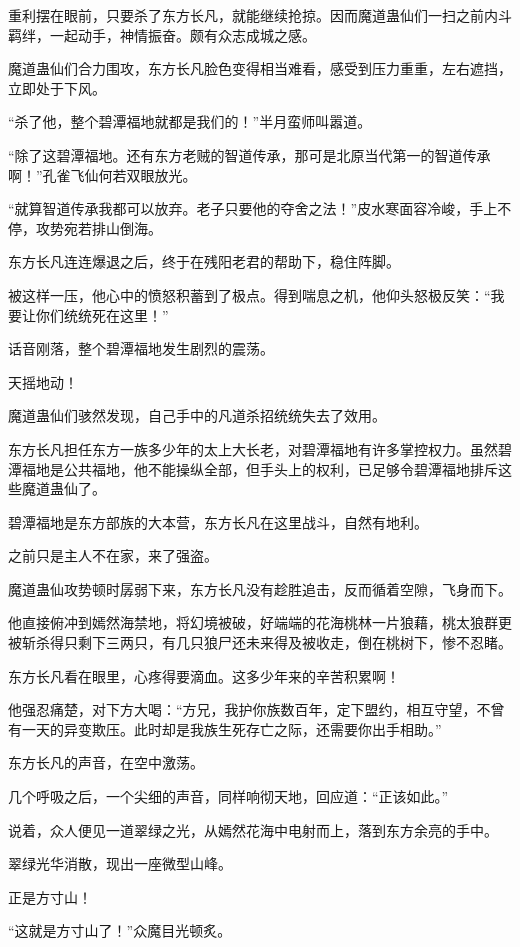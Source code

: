 \begin{this_body}
重利摆在眼前，只要杀了东方长凡，就能继续抢掠。因而魔道蛊仙们一扫之前内斗羁绊，一起动手，神情振奋。颇有众志成城之感。

魔道蛊仙们合力围攻，东方长凡脸色变得相当难看，感受到压力重重，左右遮挡，立即处于下风。

“杀了他，整个碧潭福地就都是我们的！”半月蛮师叫嚣道。

“除了这碧潭福地。还有东方老贼的智道传承，那可是北原当代第一的智道传承啊！”孔雀飞仙何若双眼放光。

“就算智道传承我都可以放弃。老子只要他的夺舍之法！”皮水寒面容冷峻，手上不停，攻势宛若排山倒海。

东方长凡连连爆退之后，终于在残阳老君的帮助下，稳住阵脚。

被这样一压，他心中的愤怒积蓄到了极点。得到喘息之机，他仰头怒极反笑：“我要让你们统统死在这里！”

话音刚落，整个碧潭福地发生剧烈的震荡。

天摇地动！

魔道蛊仙们骇然发现，自己手中的凡道杀招统统失去了效用。

东方长凡担任东方一族多少年的太上大长老，对碧潭福地有许多掌控权力。虽然碧潭福地是公共福地，他不能操纵全部，但手头上的权利，已足够令碧潭福地排斥这些魔道蛊仙了。

碧潭福地是东方部族的大本营，东方长凡在这里战斗，自然有地利。

之前只是主人不在家，来了强盗。

魔道蛊仙攻势顿时孱弱下来，东方长凡没有趁胜追击，反而循着空隙，飞身而下。

他直接俯冲到嫣然海禁地，将幻境被破，好端端的花海桃林一片狼藉，桃太狼群更被斩杀得只剩下三两只，有几只狼尸还未来得及被收走，倒在桃树下，惨不忍睹。

东方长凡看在眼里，心疼得要滴血。这多少年来的辛苦积累啊！

他强忍痛楚，对下方大喝：“方兄，我护你族数百年，定下盟约，相互守望，不曾有一天的异变欺压。此时却是我族生死存亡之际，还需要你出手相助。”

东方长凡的声音，在空中激荡。

几个呼吸之后，一个尖细的声音，同样响彻天地，回应道：“正该如此。”

说着，众人便见一道翠绿之光，从嫣然花海中电射而上，落到东方余亮的手中。

翠绿光华消散，现出一座微型山峰。

正是方寸山！

“这就是方寸山了！”众魔目光顿炙。


\end{this_body}
